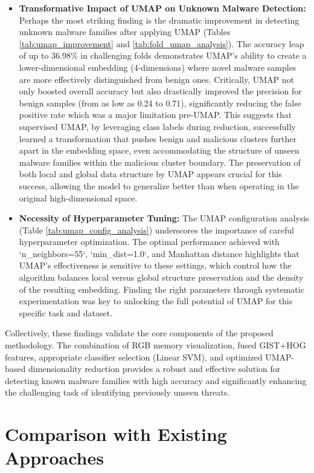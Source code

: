 \begin{itemize}
    \item \textbf{Transformative Impact of UMAP on Unknown Malware Detection:} Perhaps the most striking finding is the dramatic improvement in detecting unknown malware families after applying UMAP (Tables \ref{tab:umap_improvement} and \ref{tab:fold_umap_analysis}). The accuracy leap of up to 36.98\% in challenging folds demonstrates UMAP's ability to create a lower-dimensional embedding (4-dimensions) where novel malware samples are more effectively distinguished from benign ones. Critically, UMAP not only boosted overall accuracy but also drastically improved the precision for benign samples (from as low as 0.24 to 0.71), significantly reducing the false positive rate which was a major limitation pre-UMAP. This suggests that supervised UMAP, by leveraging class labels during reduction, successfully learned a transformation that pushes benign and malicious clusters further apart in the embedding space, even accommodating the structure of unseen malware families within the malicious cluster boundary. The preservation of both local and global data structure by UMAP \citep{mcinnes2018umap} appears crucial for this success, allowing the model to generalize better than when operating in the original high-dimensional space.

    \item \textbf{Necessity of Hyperparameter Tuning:} The UMAP configuration analysis (Table \ref{tab:umap_config_analysis}) underscores the importance of careful hyperparameter optimization. The optimal performance achieved with `n_neighbors=55`, `min_dist=1.0`, and Manhattan distance highlights that UMAP's effectiveness is sensitive to these settings, which control how the algorithm balances local versus global structure preservation and the density of the resulting embedding. Finding the right parameters through systematic experimentation was key to unlocking the full potential of UMAP for this specific task and dataset.
\end{itemize}

Collectively, these findings validate the core components of the proposed methodology. The combination of RGB memory visualization, fused GIST+HOG features, appropriate classifier selection (Linear SVM), and optimized UMAP-based dimensionality reduction provides a robust and effective solution for detecting known malware families with high accuracy and significantly enhancing the challenging task of identifying previously unseen threats.

\section{Comparison with Existing Approaches}
\label{sec:comparison_literature}


